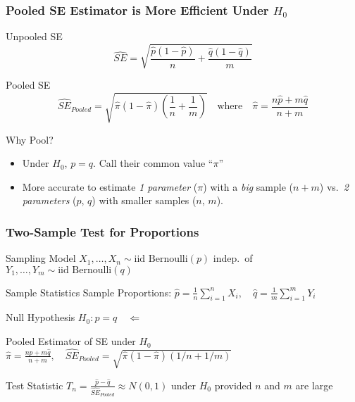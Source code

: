 \begin{frame}
	\frametitle{Pooled SE Estimator is More Efficient Under $H_0$}
	\begin{block}
    {Unpooled SE}
    \vspace{-1em}
	$$\widehat{SE} = \sqrt{\frac{\widehat{p}(1-\widehat{p})}{n} + \frac{\widehat{q}(1-\widehat{q})}{m}}$$
	\end{block}

  \vspace{-2em}

	\begin{block}
		{Pooled SE}
    \vspace{-1em}
		$$\widehat{SE}_{Pooled} = \sqrt{\widehat{\pi}(1-\widehat{\pi})\left( \frac{1}{n} + \frac{1}{m} \right) } \quad \mbox{where}\quad \widehat{\pi} = \displaystyle \frac{n \widehat{p} + m \widehat{q}}{n + m}$$
	\end{block}

  \vspace{-0.5em}

  \begin{alertblock}{Why Pool?}
    \begin{itemize}
      \item Under $H_0$, $p = q$. Call their common value ``$\pi$''
      \item More accurate to estimate \emph{1 parameter} ($\pi$) with a \emph{big} sample ($n+m$) vs.\ \emph{2 parameters} ($p$, $q$) with smaller samples ($n$, $m$).
    \end{itemize}
	\end{alertblock}
\end{frame}
\begin{frame}
	\frametitle{Two-Sample Test for Proportions}
	\begin{block}
		{Sampling Model}
		\small
		$X_1, \hdots, X_n \sim \mbox{iid Bernoulli}(p)$ indep.\  of $Y_1, \hdots, Y_m \sim \mbox{iid Bernoulli}(q)$
	\end{block}
	\begin{block}
		{Sample Statistics}
			Sample Proportions: $\displaystyle\widehat{p} = \frac{1}{n}\sum_{i=1}^{n} X_i, \quad\displaystyle\widehat{q} = \frac{1}{m}\sum_{i=1}^{m} Y_i$
	\end{block}
	\begin{block}
		{Null Hypothesis}
		$H_0\colon p = q \quad \Leftarrow \; $\fbox{ i.e.\ $p - q = 0$}
	\end{block}
	\begin{block}
		{Pooled Estimator of SE under $H_0$}
		$\widehat{\pi} = \displaystyle \frac{n \widehat{p} + m \widehat{q}}{n + m}, \quad \widehat{SE}_{Pooled} = \sqrt{\widehat{\pi}(1-\widehat{\pi})\left( 1/n + 1/m \right) }$
	\end{block}
	\begin{block}
		{Test Statistic}
		$\displaystyle T_n = \frac{\widehat{p}- \widehat{q}}{\widehat{SE}_{Pooled}} \approx N(0,1)$ under $H_0$ provided $n$ and $m$ are large
	\end{block}
\end{frame}

